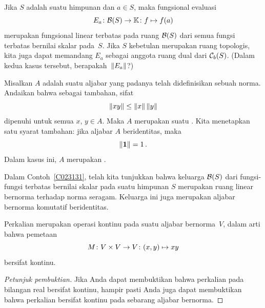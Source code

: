 \begin{exam}\label{C023464} Jika $S$ adalah suatu himpunan dan $a \in S$, maka fungsional evaluasi
     \[ E_a\colon \mathcal{B}(S) \rightarrow \mathbb{K}\colon f \mapsto f(a) \]
merupakan fungsional linear terbatas pada ruang $\mathcal{B}(S)$ dari semua fungsi terbatas bernilai
skalar pada~$S$. Jika $S$ kebetulan merupakan ruang topologis, kita juga dapat memandang $E_a$
sebagai anggota ruang dual dari $\mathcal{C}_b(S)$. (Dalam kedua kasus tersebut, berapakah~$\lVert E_a\rVert$?)
\end{exam}

\begin{defn}\label{def_norm_alg} Misalkan $A$ adalah suatu aljabar yang padanya telah didefinisikan sebuah norma. Andaikan bahwa sebagai tambahan,
sifat 
  \[ \lVert xy\rVert \le \lVert x\rVert\,\lVert y\rVert \]
dipenuhi untuk semua $x$, $y \in A$. Maka $A$ merupakan suatu
. Kita menetapkan satu syarat tambahan: jika aljabar $A$ beridentitas, maka
   \[ \lVert\mathbf{1}\rVert = 1\,. \]
Dalam kasus ini, $A$ merupakan
.
\end{defn}

\begin{exam}\label{C023448} Dalam Contoh~\ref{C023131}, telah kita tunjukkan bahwa keluarga
$\mathcal{B}(S)$ dari fungsi-fungsi terbatas bernilai skalar pada suatu himpunan $S$ merupakan ruang linear bernorma terhadap
norma seragam. Keluarga ini juga merupakan aljabar bernorma komutatif beridentitas.
\end{exam}

\begin{prop} Perkalian merupakan operasi kontinu pada suatu aljabar bernorma~$V$, dalam arti
bahwa pemetaan
   \[ M \colon V \times V \rightarrow V \colon (x,y) \mapsto  xy \]
bersifat kontinu.
\end{prop}

\begin{proof}[\emph{Petunjuk pembuktian}] Jika Anda dapat membuktikan bahwa perkalian pada bilangan real
bersifat kontinu, hampir pasti Anda juga dapat membuktikan bahwa perkalian bersifat kontinu pada sebarang aljabar
bernorma. \ns
\end{proof}

